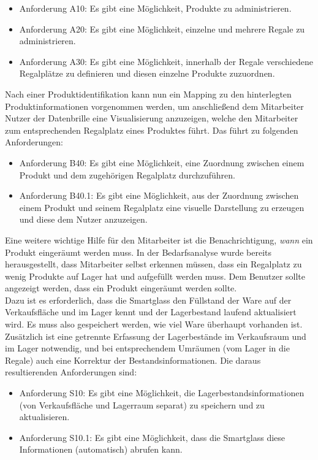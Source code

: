 \begin{itemize}
	\item Anforderung A10: Es gibt eine Möglichkeit, Produkte zu administrieren.\label{anforderung_a10}
	\item Anforderung A20: Es gibt eine Möglichkeit, einzelne und mehrere Regale zu administrieren. \label{anforderung_a20}
	\item Anforderung A30: Es gibt eine Möglichkeit, innerhalb der Regale verschiedene Regalplätze zu definieren und diesen einzelne Produkte zuzuordnen. \label{anforderung_a30}
\end{itemize}

Nach einer Produktidentifikation kann nun ein Mapping zu den hinterlegten Produktinformationen vorgenommen werden, um anschließend dem Mitarbeiter \bzw Nutzer der Datenbrille eine Visualisierung anzuzeigen, welche den Mitarbeiter zum entsprechenden Regalplatz eines Produktes führt. Das führt zu folgenden Anforderungen:

\begin{itemize}
	\item Anforderung B40: Es gibt eine Möglichkeit, eine Zuordnung zwischen einem Produkt und dem zugehörigen Regalplatz durchzuführen. \label{anforderung_b40}
	\item Anforderung B40.1: Es gibt eine Möglichkeit, aus der Zuordnung zwischen einem Produkt und seinem Regalplatz eine visuelle Darstellung zu erzeugen und diese dem Nutzer anzuzeigen.\label{anforderung_b40_1}
\end{itemize}

Eine weitere wichtige Hilfe für den Mitarbeiter ist die Benachrichtigung, \textit{wann} ein Produkt eingeräumt werden muss. In der Bedarfsanalyse wurde bereits herausgestellt, dass Mitarbeiter selbst erkennen müssen, dass ein Regalplatz zu wenig Produkte auf Lager hat und aufgefüllt werden muss. Dem Benutzer sollte angezeigt werden, dass ein Produkt eingeräumt werden sollte.\\ 
Dazu ist es erforderlich, dass die Smartglass den Füllstand der Ware auf der Verkaufsfläche und im Lager kennt und der Lagerbestand laufend aktualisiert wird. Es muss also gespeichert werden, wie viel Ware überhaupt vorhanden ist. Zusätzlich ist eine getrennte Erfassung der Lagerbestände im Verkaufsraum und im Lager notwendig, und bei entsprechendem Umräumen (\zB vom Lager in die Regale) auch eine Korrektur der Bestandsinformationen. Die daraus resultierenden Anforderungen sind: 
\begin{itemize}
	\item Anforderung S10: Es gibt eine Möglichkeit, die Lagerbestandsinformationen (von Verkaufsfläche und Lagerraum separat) zu speichern und zu aktualisieren. \label{anforderung_s10}
	\item Anforderung S10.1: Es gibt eine Möglichkeit, dass die Smartglass diese Informationen (automatisch) abrufen kann. \label{anforderung_s10_1}
\end{itemize}

